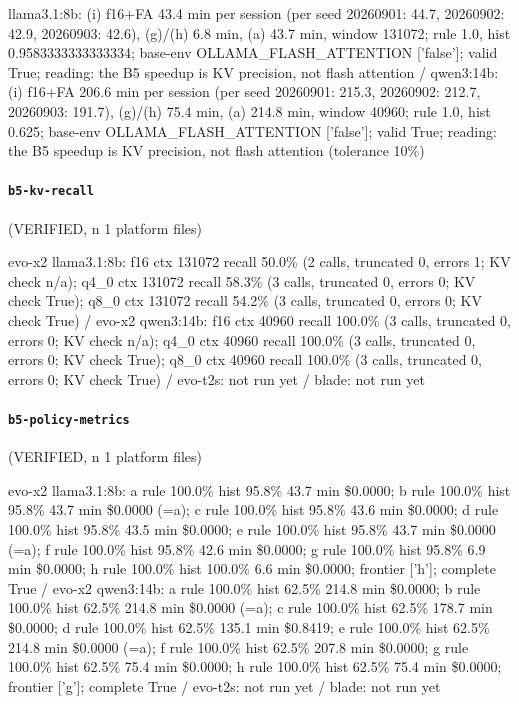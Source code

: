 {\footnotesize\raggedright llama3.1:8b: (i) f16+FA 43.4 min per session (per seed 20260901: 44.7, 20260902: 42.9, 20260903: 42.6), (g)/(h) 6.8 min, (a) 43.7 min, window 131072; rule 1.0, hist 0.9583333333333334; base-env OLLAMA\_FLASH\_ATTENTION ['false']; valid True; reading: the B5 speedup is KV precision, not flash attention / qwen3:14b: (i) f16+FA 206.6 min per session (per seed 20260901: 215.3, 20260902: 212.7, 20260903: 191.7), (g)/(h) 75.4 min, (a) 214.8 min, window 40960; rule 1.0, hist 0.625; base-env OLLAMA\_FLASH\_ATTENTION ['false']; valid True; reading: the B5 speedup is KV precision, not flash attention (tolerance 10\%)\par}

\paragraph{\texttt{b5-kv-recall}} (VERIFIED, n 1 platform files)

{\footnotesize\raggedright evo-x2 llama3.1:8b: f16 ctx 131072 recall 50.0\% (2 calls, truncated 0, errors 1; KV check n/a); q4\_0 ctx 131072 recall 58.3\% (3 calls, truncated 0, errors 0; KV check True); q8\_0 ctx 131072 recall 54.2\% (3 calls, truncated 0, errors 0; KV check True) / evo-x2 qwen3:14b: f16 ctx 40960 recall 100.0\% (3 calls, truncated 0, errors 0; KV check n/a); q4\_0 ctx 40960 recall 100.0\% (3 calls, truncated 0, errors 0; KV check True); q8\_0 ctx 40960 recall 100.0\% (3 calls, truncated 0, errors 0; KV check True) / evo-t2s: not run yet / blade: not run yet\par}

\paragraph{\texttt{b5-policy-metrics}} (VERIFIED, n 1 platform files)

{\footnotesize\raggedright evo-x2 llama3.1:8b: a rule 100.0\% hist 95.8\% 43.7 min \$0.0000; b rule 100.0\% hist 95.8\% 43.7 min \$0.0000 (=a); c rule 100.0\% hist 95.8\% 43.6 min \$0.0000; d rule 100.0\% hist 95.8\% 43.5 min \$0.0000; e rule 100.0\% hist 95.8\% 43.7 min \$0.0000 (=a); f rule 100.0\% hist 95.8\% 42.6 min \$0.0000; g rule 100.0\% hist 95.8\% 6.9 min \$0.0000; h rule 100.0\% hist 100.0\% 6.6 min \$0.0000; frontier ['h']; complete True / evo-x2 qwen3:14b: a rule 100.0\% hist 62.5\% 214.8 min \$0.0000; b rule 100.0\% hist 62.5\% 214.8 min \$0.0000 (=a); c rule 100.0\% hist 62.5\% 178.7 min \$0.0000; d rule 100.0\% hist 62.5\% 135.1 min \$0.8419; e rule 100.0\% hist 62.5\% 214.8 min \$0.0000 (=a); f rule 100.0\% hist 62.5\% 207.8 min \$0.0000; g rule 100.0\% hist 62.5\% 75.4 min \$0.0000; h rule 100.0\% hist 62.5\% 75.4 min \$0.0000; frontier ['g']; complete True / evo-t2s: not run yet / blade: not run yet\par}

